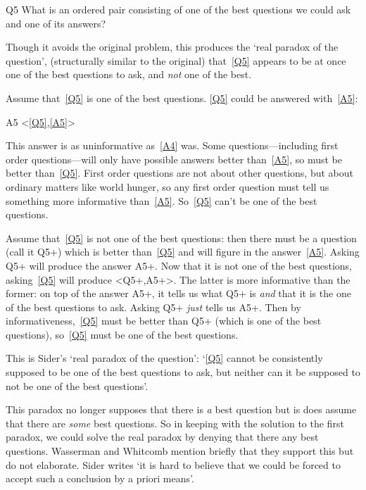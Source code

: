 	\begin{principle}{Q5}\label{Q5}
	What is an ordered pair consisting of one of the best questions we could ask and one of its answers?
	\end{principle}

Though it avoids the original problem, this produces the `real paradox of the question', (structurally similar to the original) that~\ref{Q5} appears to be at once one of the best questions to ask, and \emph{not} one of the best.

Assume that~\ref{Q5} is one of the best questions.
\ref{Q5} could be answered  with~\ref{A5}:
	
	\begin{principle}{A5}\label{A5}
	<\ref{Q5},\ref{A5}>
	\end{principle}

This answer is as uninformative as~\ref{A4} was.
Some questions---including first order questions---will only have possible answers better than~\ref{A5}, so must be better than~\ref{Q5}.
First order questions are not about other questions, but about ordinary matters like world hunger, so any first order question must tell us something more informative than~\ref{A5}.
So~\ref{Q5} can't be one of the best questions.
\parencite[4]{Sider1997}

Assume that~\ref{Q5} is not one of the best questions: then there must be a question (call it Q5+) which is better than~\ref{Q5} and will figure in the answer~\ref{A5}.
Asking Q5+ will produce the answer A5+.
Now that it is not one of the best questions, asking~\ref{Q5} will produce <Q5+,A5+>.
The latter is more informative than the former: on top of the answer A5+, it tells us what Q5+ is \emph{and} that it is the one of the best questions to ask.
Asking Q5+ \emph{just} tells us A5+.
Then by informativeness,~\ref{Q5} must be better than Q5+ (which is one of the best questions), so~\ref{Q5} must be one of the best questions.

This is Sider's `real paradox of the question': `\ref{Q5} cannot be consistently supposed to be one of the best questions to ask, but neither can it be supposed to not be one of the best questions'.

This paradox no longer supposes that there is \emph{a} best question but is does assume that there are \emph{some} best questions.
So in keeping with the solution to the first paradox, we could solve the real paradox by denying that there any best questions.
Wasserman and Whitcomb mention briefly that they support this but do not elaborate. 
\parencite[151]{Wasserman_2011}
Sider writes `it is hard to believe that we could be forced to accept such a conclusion by a priori means'.
\parencite[4]{Sider1997}


